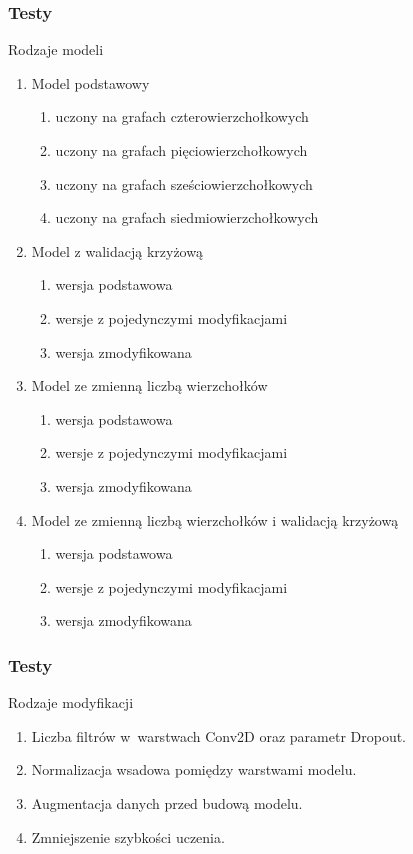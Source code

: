 \begin{frame}
    \frametitle{Testy}

    Rodzaje modeli
    \begin{enumerate}
        \item Model podstawowy
        \begin{enumerate}
            \item uczony na grafach czterowierzchołkowych
            \item uczony na grafach pięciowierzchołkowych
            \item uczony na grafach sześciowierzchołkowych
            \item uczony na grafach siedmiowierzchołkowych
        \end{enumerate}
        \item Model z walidacją krzyżową
        \begin{enumerate}
            \item wersja podstawowa
            \item wersje z pojedynczymi modyfikacjami
            \item wersja zmodyfikowana
        \end{enumerate}
        \item Model ze zmienną liczbą wierzchołków
        \begin{enumerate}
            \item wersja podstawowa
            \item wersje z pojedynczymi modyfikacjami
            \item wersja zmodyfikowana
        \end{enumerate}
        \item Model ze zmienną liczbą wierzchołków i walidacją krzyżową
        \begin{enumerate}
            \item wersja podstawowa
            \item wersje z pojedynczymi modyfikacjami
            \item wersja zmodyfikowana
        \end{enumerate}
    \end{enumerate}
    
\end{frame}

\begin{frame}
    \frametitle{Testy}

    Rodzaje modyfikacji
    \begin{enumerate}
        \item Liczba filtrów w~warstwach Conv2D oraz parametr Dropout.
        \item Normalizacja wsadowa pomiędzy warstwami modelu.
        \item Augmentacja danych przed budową modelu.
        \item Zmniejszenie szybkości uczenia.
    \end{enumerate}
    
\end{frame}


